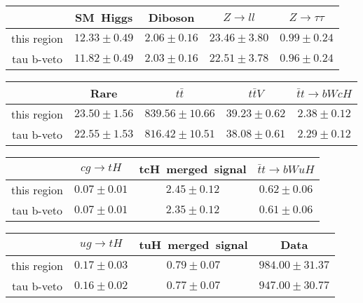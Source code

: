 \centering
\begin{tabular}{|c|c|c|c|c|} \hline
 & SM~Higgs & Diboson & $Z\to ll$ & $Z\to \tau\tau$\\\hline
this region & $12.33\pm0.49$ & $2.06\pm0.16$ & $23.46\pm3.80$ & $0.99\pm0.24$\\\hline
tau b-veto & $11.82\pm0.49$ & $2.03\pm0.16$ & $22.51\pm3.78$ & $0.96\pm0.24$\\\hline
\end{tabular}
\begin{tabular}{|c|c|c|c|c|} \hline
 & Rare & $t\bar{t}$ & $t\bar{t}V$ & $\bar{t}t\to bWcH$\\\hline
this region & $23.50\pm1.56$ & $839.56\pm10.66$ & $39.23\pm0.62$ & $2.38\pm0.12$\\\hline
tau b-veto & $22.55\pm1.53$ & $816.42\pm10.51$ & $38.08\pm0.61$ & $2.29\pm0.12$\\\hline
\end{tabular}
\begin{tabular}{|c|c|c|c|} \hline
 & $cg\to tH$ & tcH~merged~signal & $\bar{t}t\to bWuH$\\\hline
this region & $0.07\pm0.01$ & $2.45\pm0.12$ & $0.62\pm0.06$\\\hline
tau b-veto & $0.07\pm0.01$ & $2.35\pm0.12$ & $0.61\pm0.06$\\\hline
\end{tabular}
\begin{tabular}{|c|c|c|c|} \hline
 & $ug\to tH$ & tuH~merged~signal & Data\\\hline
this region & $0.17\pm0.03$ & $0.79\pm0.07$ & $984.00\pm31.37$\\\hline
tau b-veto & $0.16\pm0.02$ & $0.77\pm0.07$ & $947.00\pm30.77$\\\hline
\end{tabular}
